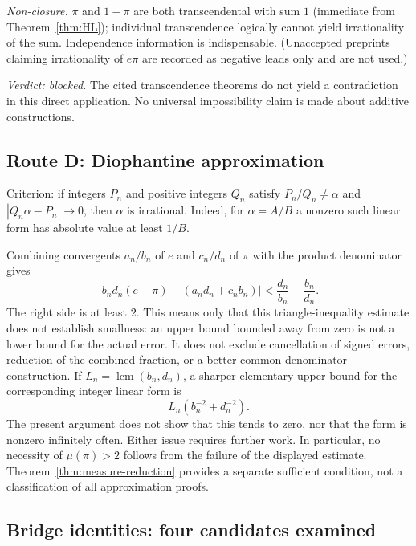 \documentclass[11pt]{amsart}
\theoremstyle{definition}
\theoremstyle{remark}
\numberwithin{equation}{section}
\newcommand{\irr}{\mu}
\newcommand{\ee}{e}
\begin{document}
\emph{Non-closure.} $\pi$ and $1-\pi$ are both transcendental with sum $1$ (immediate from Theorem~\ref{thm:HL}); individual transcendence logically cannot yield irrationality of the sum. Independence information is indispensable. (Unaccepted preprints claiming irrationality of $e\pi$ \cite{CarellaEpi} are recorded as negative leads only and are not used.)

\emph{Verdict: blocked.} The cited transcendence theorems do not yield a contradiction in this direct application. No universal impossibility claim is made about additive constructions.

\subsection{Route D: Diophantine approximation}

Criterion: if integers $P_n$ and positive integers $Q_n$ satisfy $P_n/Q_n\ne\alpha$ and $|Q_n\alpha-P_n|\to0$, then $\alpha$ is irrational. Indeed, for $\alpha=A/B$ a nonzero such linear form has absolute value at least $1/B$.

Combining convergents $a_n/b_n$ of $\ee$ and $c_n/d_n$ of $\pi$ with the product denominator gives
\[
\left|b_nd_n(e+\pi)-(a_nd_n+c_nb_n)\right|
<\frac{d_n}{b_n}+\frac{b_n}{d_n}.
\]
The right side is at least $2$. This means only that this triangle-inequality estimate does not establish smallness: an upper bound bounded away from zero is not a lower bound for the actual error. It does not exclude cancellation of signed errors, reduction of the combined fraction, or a better common-denominator construction. If $L_n=\operatorname{lcm}(b_n,d_n)$, a sharper elementary upper bound for the corresponding integer linear form is
\[
L_n\left(b_n^{-2}+d_n^{-2}\right).
\]
The present argument does not show that this tends to zero, nor that the form is nonzero infinitely often. Either issue requires further work. In particular, no necessity of $\irr(\pi)>2$ follows from the failure of the displayed estimate. Theorem~\ref{thm:measure-reduction} provides a separate sufficient condition, not a classification of all approximation proofs.

\subsection{Bridge identities: four candidates examined}\label{sub:bridges}
\end{document}
